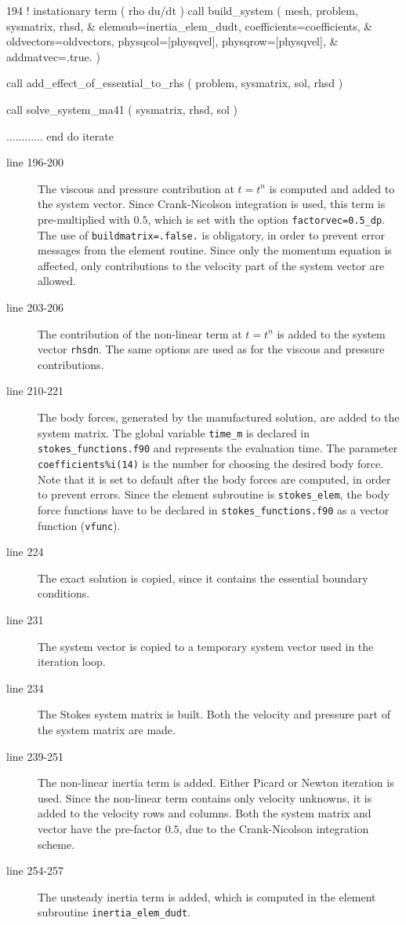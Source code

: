 \begin{listing}{194}
!     instationary term ( rho du/dt ) 
      call build_system ( mesh, problem, sysmatrix, rhsd, &
        elemsub=inertia_elem_dudt, coefficients=coefficients, &
        oldvectors=oldvectors, physqcol=[physqvel], physqrow=[physqvel], &
        addmatvec=.true. )

      call add_effect_of_essential_to_rhs ( problem, sysmatrix, sol, rhsd )

      call solve_system_ma41 ( sysmatrix, rhsd, sol )
 
      ............
    end do iterate
\end{listing} 

\begin{description}
  \item[line 196-200] The viscous and pressure contribution at $t=t^{n}$ is computed and added to the system vector. Since Crank-Nicolson
integration is used, this term is pre-multiplied with $0.5$, which is set with the option \texttt{factorvec=0.5\_dp}. The use of
\texttt{buildmatrix=.false.} is obligatory, in order to prevent error messages from the element routine. Since only the momentum equation
is affected, only contributions to the velocity part of the system vector are allowed.
  \item[line 203-206] The contribution of the non-linear term at $t=t^{n}$ is added to the system vector \texttt{rhsdn}. The same options are used as for the viscous and pressure contributions.
  \item[line 210-221] The body forces, generated by the manufactured solution, are added to the system matrix. The global variable \texttt{time\_m} is declared in \texttt{stokes\_functions.f90} and represents the evaluation time. The parameter \texttt{coefficients\%i(14)} is the number for choosing the desired body force. Note that it is set to default after the body forces are computed, in order to prevent errors. Since the element subroutine is \texttt{stokes\_elem}, the body force functions have to be declared in \texttt{stokes\_functions.f90} as a vector function (\texttt{vfunc}).
  \item[line 224] The exact solution is copied, since it contains the essential boundary conditions.
  \item[line 231] The system vector is copied to a temporary system vector used in the iteration loop.
  \item[line 234] The Stokes system matrix is built. Both the velocity and pressure part of the system matrix are made.
  \item[line 239-251] The non-linear inertia term is added. Either Picard or Newton iteration is used. Since the non-linear term contains only velocity unknowns, it is added to the velocity rows and columns. Both the system matrix and vector have the pre-factor $0.5$, due to the Crank-Nicolson integration scheme.
  \item[line 254-257] The unsteady inertia term is added, which is computed in the element subroutine \texttt{inertia\_elem\_dudt}.
\end{description}
